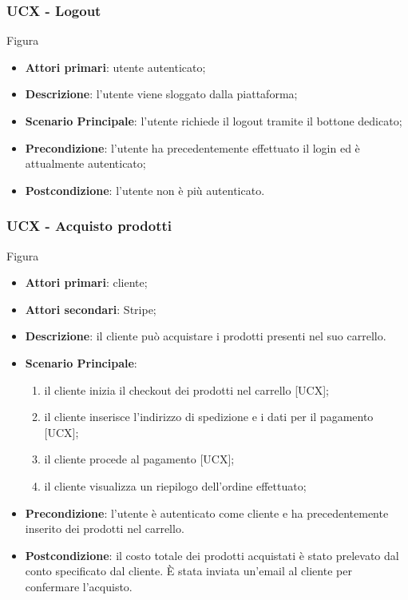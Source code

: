 \subsubsection{UCX - Logout}
Figura \\
\begin{itemize}
\item \textbf{Attori primari}: utente autenticato;
\item \textbf{Descrizione}: l'utente viene sloggato dalla piattaforma;
\item \textbf{Scenario Principale}: l'utente richiede il logout tramite il bottone dedicato;
\item \textbf{Precondizione}: l'utente ha precedentemente effettuato il login ed è attualmente autenticato;
\item \textbf{Postcondizione}: l'utente non è più autenticato.
\end{itemize}

\subsubsection{UCX - Acquisto prodotti}
Figura \\
\begin{itemize}
\item \textbf{Attori primari}: cliente;
\item \textbf{Attori secondari}: Stripe;
\item \textbf{Descrizione}: il cliente può acquistare i prodotti presenti nel suo carrello.
\item \textbf{Scenario Principale}: 
\begin{enumerate}
	\item il cliente inizia il checkout dei prodotti nel carrello [UCX];
	\item il cliente inserisce l'indirizzo di spedizione e i dati per il pagamento [UCX];
	\item il cliente procede al pagamento [UCX];
	\item il cliente visualizza un riepilogo dell'ordine effettuato;
\end{enumerate}
\item \textbf{Precondizione}: l'utente è autenticato come cliente e ha precedentemente inserito dei prodotti nel carrello.
\item \textbf{Postcondizione}: il costo totale dei prodotti acquistati è stato prelevato dal conto specificato dal cliente. È stata inviata un'email al cliente per confermare l'acquisto.
\end{itemize}
